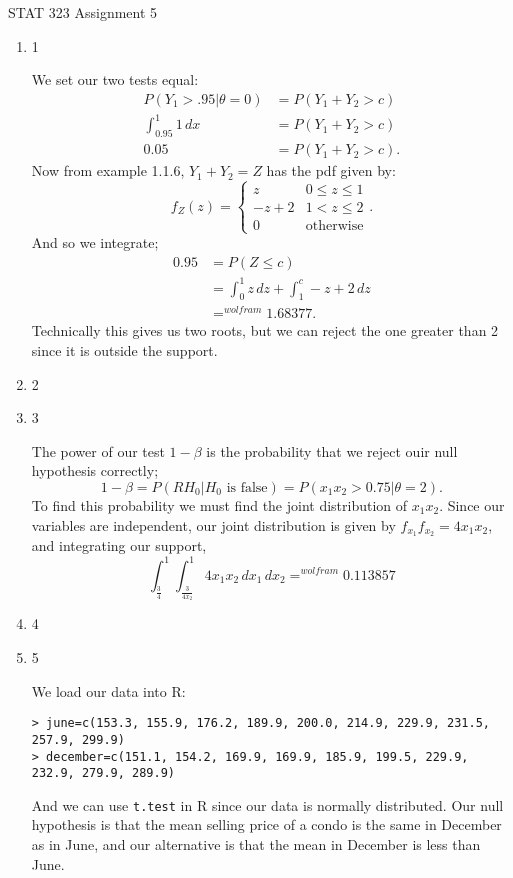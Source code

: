 \documentclass{article}
\begin{document}
    \huge STAT 323 Assignment 5
    \normalsize
\begin{enumerate} 
    \item 1

        We set our two tests equal:
        \begin{align*}
            P(Y_1>.95|\theta=0)&= P(Y_1+Y_2>c) \\
            \int_{0.95}^{1} 1 \, d x &= P(Y_1+Y_2>c) \\
            0.05&= P(Y_1+Y_2>c) 
        .\end{align*}
        Now from example 1.1.6, $Y_1+Y_2=Z$ has the pdf given by:
        \[
        f_Z(z)=\begin{cases}
            z& 0\leq z\leq1\\
            -z+2 &1< z \leq2\\
            0 &\text{otherwise}
        \end{cases}
        .\] 
        And so we integrate;
        \begin{align*}
            0.95&= P(Z\leq c) \\
            &= \int_{0}^{1} z \, d z+\int_{1}^{c} -z+2 \, d z   \\
            &= ^{wolfram}1.68377 
        .\end{align*}
        Technically this gives us two roots, but we can reject the one greater than 2 since it is outside the support.
    \item 2 
    \item 3

        The power of our test $1-\beta$ is the probability that we reject ouir null hypothesis correctly;
        \[
        1-\beta=P(RH_0|H_0\text{ is false})=P(x_1x_2>0.75|\theta=2)
        .\] 
        To find this probability we must find the joint distribution of $x_1x_2$. Since our variables are independent,
        our joint distribution is given by $f_{x_1}f_{x_2}=4x_1x_2$, and integrating our support, 
        \[ \int_{\frac{3}{4}}^{1} \int_{\frac{3}{4x_2}}^{1} 4x_1x_2 \, d x_1  \, d x_2 =^{wolfram}0.113857\] 

    \item 4
    \item 5

        We load our data into R:
        \begin{verbatim}
> june=c(153.3, 155.9, 176.2, 189.9, 200.0, 214.9, 229.9, 231.5, 257.9, 299.9)
> december=c(151.1, 154.2, 169.9, 169.9, 185.9, 199.5, 229.9, 232.9, 279.9, 289.9)
        \end{verbatim}
        And we can use \verb|t.test| in R since our data is normally distributed. Our null hypothesis is that the mean selling 
        price of a condo is the same in December as in June, and our alternative is that the mean in December is less than June.


\end{enumerate}
\end{document}
